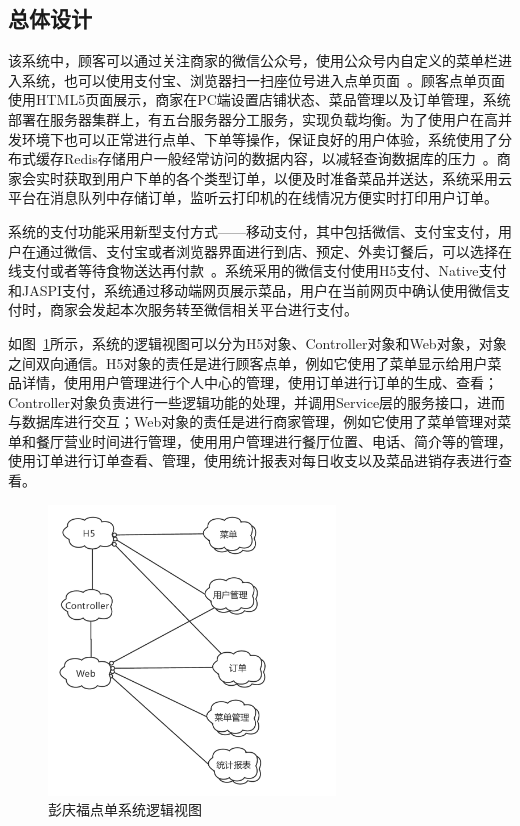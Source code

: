 \subsection{总体设计}
该系统中，顾客可以通过关注商家的微信公众号，使用公众号内自定义的菜单栏进入系统，也可以使用支付宝、浏览器扫一扫座位号进入点单页面~\cite{swain2019electrical}。顾客点单页面使用HTML5页面展示，商家在PC端设置店铺状态、菜品管理以及订单管理，系统部署在服务器集群上，有五台服务器分工服务，实现负载均衡。为了使用户在高并发环境下也可以正常进行点单、下单等操作，保证良好的用户体验，系统使用了分布式缓存Redis存储用户一般经常访问的数据内容，以减轻查询数据库的压力~\cite{balalaie2016microservices}。商家会实时获取到用户下单的各个类型订单，以便及时准备菜品并送达，系统采用云平台在消息队列中存储订单，监听云打印机的在线情况方便实时打印用户订单。

系统的支付功能采用新型支付方式——移动支付，其中包括微信、支付宝支付，用户在通过微信、支付宝或者浏览器界面进行到店、预定、外卖订餐后，可以选择在线支付或者等待食物送达再付款~\cite{liu2015application}。系统采用的微信支付使用H5支付、Native支付和JASPI支付，系统通过移动端网页展示菜品，用户在当前网页中确认使用微信支付时，商家会发起本次服务转至微信相关平台进行支付。

如图~\ref{fig_logicCH3}所示，系统的逻辑视图可以分为H5对象、Controller对象和Web对象，对象之间双向通信。H5对象的责任是进行顾客点单，例如它使用了菜单显示给用户菜品详情，使用用户管理进行个人中心的管理，使用订单进行订单的生成、查看；Controller对象负责进行一些逻辑功能的处理，并调用Service层的服务接口，进而与数据库进行交互；Web对象的责任是进行商家管理，例如它使用了菜单管理对菜单和餐厅营业时间进行管理，使用用户管理进行餐厅位置、电话、简介等的管理，使用订单进行订单查看、管理，使用统计报表对每日收支以及菜品进销存表进行查看。

\begin{figure}[htbp!]
  \centering
  \includegraphics[width=3in]{FIGs/chapter3/logic.pdf}
  \caption{彭庆福点单系统逻辑视图}\label{fig_logicCH3}
\end{figure}

